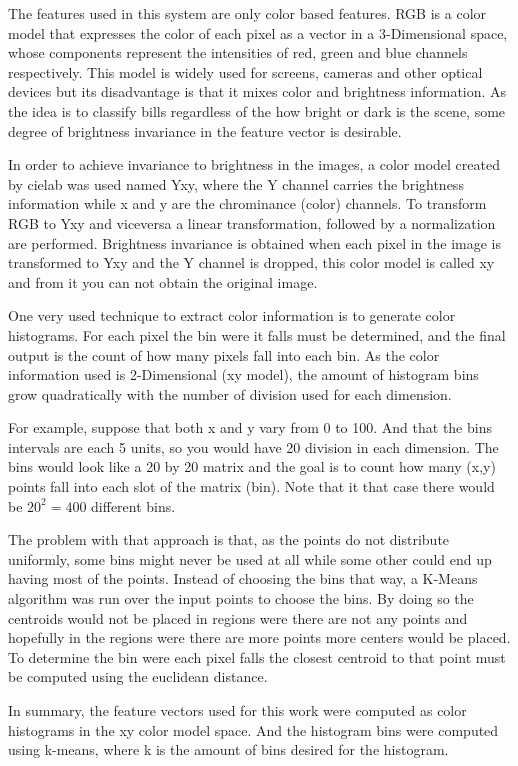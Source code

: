 \documentclass{IEEEtran}
\begin{document}
The features used in this system are only color based features. RGB is a color model that expresses the color of
each pixel as a vector in a 3-Dimensional space, whose components represent the intensities of red, green and blue
channels respectively. This model is widely used for screens, cameras and other optical devices but its disadvantage is 
that it mixes color and brightness information. As the idea is to classify bills regardless of the how bright or 
dark is the scene, some degree of brightness invariance in the feature vector is desirable.

In order to achieve invariance to brightness in the images, a color model created by cielab was used %
named Yxy, where the Y channel carries the brightness information while x and y are the chrominance (color) 
channels. To transform RGB to Yxy and viceversa a linear transformation, followed by a normalization are
performed. Brightness invariance is obtained when each pixel in the image is transformed to Yxy and the
Y channel is dropped, this color model is called xy and from it you can not obtain the original image.

One very used technique to extract color information is to generate color histograms. For each pixel
the bin were it falls must be determined, and the final output is the count of how many pixels fall
into each bin. As the color information used is 2-Dimensional (xy model), the amount of histogram
bins grow quadratically with the number of division used for each dimension. 

For example, suppose that both x and y vary from 0 to 100. And that the bins intervals are each 5
units, so you would have 20 division in each dimension. The bins would look like a 20 by 20 matrix
and the goal is to count how many (x,y) points fall into each slot of the matrix (bin). Note that
it that case there would be $20^2=400$ different bins.

The problem with that approach is that, as the points do not distribute uniformly, some bins might
never be used at all while some other could end up having most of the points. Instead of choosing the
bins that way, a K-Means algorithm was run over the input points to choose the bins. By doing so
the centroids would not be placed in regions were there are not any points and hopefully in the
regions were there are more points more centers would be placed. To determine the bin were each pixel
falls the closest centroid to that point must be computed using the euclidean distance.

In summary, the feature vectors used for this work were computed as color histograms in the
xy color model space. And the histogram bins were computed using k-means, where k is the
amount of bins desired for the histogram.
\end{document}
